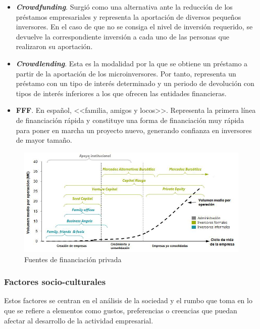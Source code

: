 \begin{itemize}
    \item \textbf{\textit{Crowdfunding}}. Surgió como una alternativa ante la reducción de los préstamos empresariales y representa la aportación de diversos pequeños inversores. En el caso de que no se consiga el nivel de inversión requerido, se devuelve la correspondiente inversión a cada uno de las personas que realizaron su aportación.
    
    \item \textbf{\textit{Crowdlending}}. Esta es la modalidad por la que se obtiene un préstamo a partir de la aportación de los microinversores. Por tanto, representa un préstamo con un tipo de interés determinado y un periodo de devolución con tipos de interés inferiores a los que ofrecen las entidades financieras.
    
    \item \textbf{\acf{FFF}}. En español, <<familia, amigos y locos>>. Representa la primera línea de financiación rápida y constituye una forma de financiación muy rápida para poner en marcha un proyecto nuevo, generando confianza en inversores de mayor tamaño.
    
\end{itemize}

\begin{figure}[h]
  \centering
  \includegraphics[width=0.8\linewidth]{figures/images/financiacion.png}
  \caption{Fuentes de financiación privada}
  \label{fig:financiacion}
\end{figure}

\clearpage


\subsubsection{Factores socio-culturales}
Estos factores se centran en el análisis de la sociedad y el rumbo que toma en lo que se refiere a elementos como gustos, preferencias o creencias que puedan afectar al desarrollo de la actividad empresarial.

